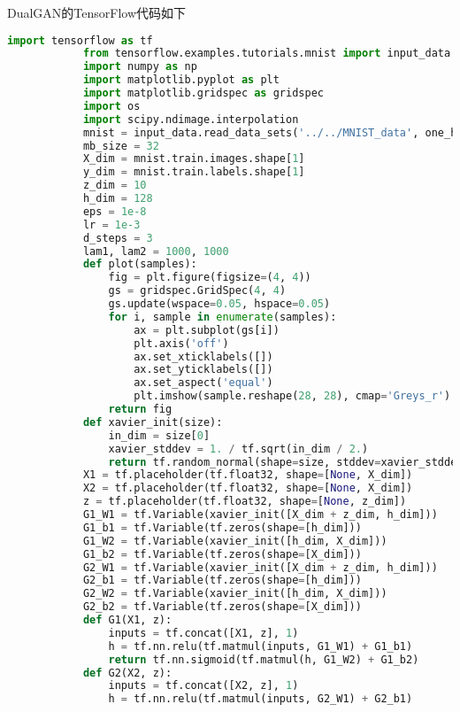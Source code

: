             \par
            DualGAN的TensorFlow代码如下
            \begin{lstlisting}[language = Python]
            import tensorflow as tf
            from tensorflow.examples.tutorials.mnist import input_data
            import numpy as np
            import matplotlib.pyplot as plt
            import matplotlib.gridspec as gridspec
            import os
            import scipy.ndimage.interpolation
            mnist = input_data.read_data_sets('../../MNIST_data', one_hot=True)
            mb_size = 32
            X_dim = mnist.train.images.shape[1]
            y_dim = mnist.train.labels.shape[1]
            z_dim = 10
            h_dim = 128
            eps = 1e-8
            lr = 1e-3
            d_steps = 3
            lam1, lam2 = 1000, 1000
            def plot(samples):
                fig = plt.figure(figsize=(4, 4))
                gs = gridspec.GridSpec(4, 4)
                gs.update(wspace=0.05, hspace=0.05)
                for i, sample in enumerate(samples):
                    ax = plt.subplot(gs[i])
                    plt.axis('off')
                    ax.set_xticklabels([])
                    ax.set_yticklabels([])
                    ax.set_aspect('equal')
                    plt.imshow(sample.reshape(28, 28), cmap='Greys_r')
                return fig
            def xavier_init(size):
                in_dim = size[0]
                xavier_stddev = 1. / tf.sqrt(in_dim / 2.)
                return tf.random_normal(shape=size, stddev=xavier_stddev)
            X1 = tf.placeholder(tf.float32, shape=[None, X_dim])
            X2 = tf.placeholder(tf.float32, shape=[None, X_dim])
            z = tf.placeholder(tf.float32, shape=[None, z_dim])
            G1_W1 = tf.Variable(xavier_init([X_dim + z_dim, h_dim]))
            G1_b1 = tf.Variable(tf.zeros(shape=[h_dim]))
            G1_W2 = tf.Variable(xavier_init([h_dim, X_dim]))
            G1_b2 = tf.Variable(tf.zeros(shape=[X_dim]))
            G2_W1 = tf.Variable(xavier_init([X_dim + z_dim, h_dim]))
            G2_b1 = tf.Variable(tf.zeros(shape=[h_dim]))
            G2_W2 = tf.Variable(xavier_init([h_dim, X_dim]))
            G2_b2 = tf.Variable(tf.zeros(shape=[X_dim]))
            def G1(X1, z):
                inputs = tf.concat([X1, z], 1)
                h = tf.nn.relu(tf.matmul(inputs, G1_W1) + G1_b1)
                return tf.nn.sigmoid(tf.matmul(h, G1_W2) + G1_b2)
            def G2(X2, z):
                inputs = tf.concat([X2, z], 1)
                h = tf.nn.relu(tf.matmul(inputs, G2_W1) + G2_b1)

\end{lstlisting}

